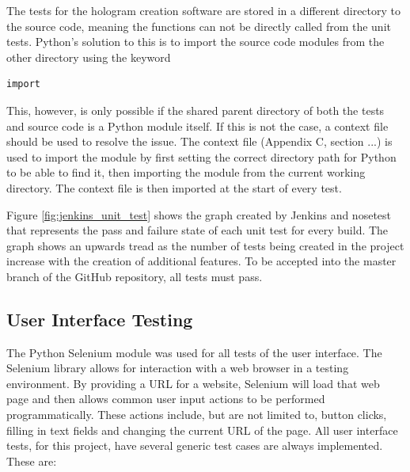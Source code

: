 The tests for the hologram creation software are stored in a different directory to the source code, meaning the functions can not be directly called from the unit tests. Python's solution to this is to import the source code modules from the other directory using the keyword \begin{verbatim}
import
\end{verbatim}
This, however, is only possible if the shared parent directory of both the tests and source code is a Python module itself. If this is not the case, a context file should be used to resolve the issue. The context file (Appendix C, section ...) is used to import the module by first setting the correct directory path for Python to be able to find it, then importing the module from the current working directory. The context file is then imported at the start of every test.

Figure \ref{fig:jenkins_unit_test} shows the graph created by Jenkins and nosetest that represents the pass and failure state of each unit test for every build. The graph shows an upwards tread as the number of tests being created in the project increase with the creation of additional features. To be accepted into the master branch of the GitHub repository, all tests must pass.

\begin{figure}[h!]
\end{figure}

\subsection{User Interface Testing}
The Python Selenium module was used for all tests of the user interface. The Selenium library allows for interaction with a web browser in a testing environment. By providing a URL for a website, Selenium will load that web page and then allows common user input actions to be performed programmatically. These actions include, but are not limited to, button clicks, filling in text fields and changing the current URL of the page. All user interface tests, for this project, have several generic test cases are always implemented. These are:

